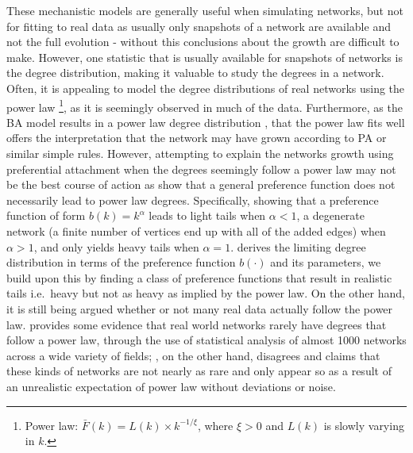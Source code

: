 \documentclass[
  sn-basic,
]{sn-jnl}
\theoremstyle{plain}
\theoremstyle{plain}
\theoremstyle{remark}
\begin{document}
These mechanistic models are generally useful when simulating networks,
but not for fitting to real data as usually only snapshots of a network
are available and not the full evolution - without this conclusions
about the growth are difficult to make. However, one statistic that is
usually available for snapshots of networks is the degree distribution,
making it valuable to study the degrees in a network. Often, it is
appealing to model the degree distributions of real networks using the
power law \footnote{Power law: \(\bar F(k) = L(k)\times k^{-1/\xi}\),
  where \(\xi>0\) and \(L(k)\) is slowly varying in \(k\).}, as it is
seemingly observed in much of the data. Furthermore, as the BA model
results in a power law degree distribution \citep{Barabasi99}, that the
power law fits well offers the interpretation that the network may have
grown according to PA or similar simple rules. However, attempting to
explain the networks growth using preferential attachment when the
degrees seemingly follow a power law may not be the best course of
action as \citet{krapivsky01} show that a general preference function
does not necessarily lead to power law degrees. Specifically, showing
that a preference function of form \(b(k) = k^\alpha\) leads to light
tails when \(\alpha<1\), a degenerate network (a finite number of
vertices end up with all of the added edges) when \(\alpha>1\), and only
yields heavy tails when \(\alpha=1\). \citet{rudas07} derives the
limiting degree distribution in terms of the preference function
\(b(\cdot)\) and its parameters, we build upon this by finding a class
of preference functions that result in realistic tails i.e.~heavy but
not as heavy as implied by the power law. On the other hand, it is still
being argued whether or not many real data actually follow the power
law. \citet{Broido_2019} provides some evidence that real world networks
rarely have degrees that follow a power law, through the use of
statistical analysis of almost 1000 networks across a wide variety of
fields; \citet{Voitalov_2019}, on the other hand, disagrees and claims
that these kinds of networks are not nearly as rare and only appear so
as a result of an unrealistic expectation of power law without
deviations or noise.
\end{document}
